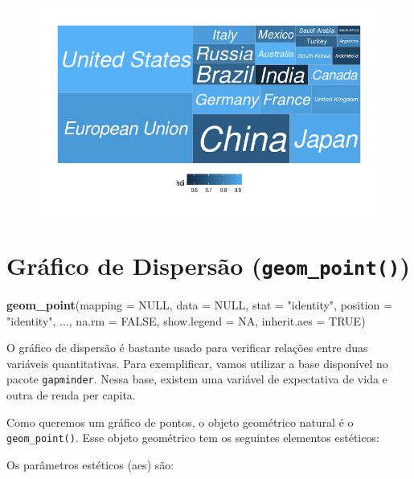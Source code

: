 \documentclass[]{book}
\newenvironment{Shaded}{\begin{snugshade}}{\end{snugshade}}
\newcommand{\KeywordTok}[1]{\textcolor[rgb]{0.13,0.29,0.53}{\textbf{#1}}}
\newcommand{\DataTypeTok}[1]{\textcolor[rgb]{0.13,0.29,0.53}{#1}}
\newcommand{\StringTok}[1]{\textcolor[rgb]{0.31,0.60,0.02}{#1}}
\newcommand{\OtherTok}[1]{\textcolor[rgb]{0.56,0.35,0.01}{#1}}
\newcommand{\NormalTok}[1]{#1}
\begin{document}
\begin{figure}
\centering
\includegraphics{images/treemapify.png}
\caption{}
\end{figure}

\section{\texorpdfstring{Gráfico de Dispersão
(\texttt{geom\_point()})}{Gráfico de Dispersão (geom\_point())}}\label{grafico-de-dispersao-geom_point}

\begin{Shaded}
\begin{Highlighting}[]
\KeywordTok{geom_point}\NormalTok{(}\DataTypeTok{mapping =} \OtherTok{NULL}\NormalTok{, }\DataTypeTok{data =} \OtherTok{NULL}\NormalTok{, }\DataTypeTok{stat =} \StringTok{"identity"}\NormalTok{, }\DataTypeTok{position =} \StringTok{"identity"}\NormalTok{,}
\NormalTok{           ..., }\DataTypeTok{na.rm =} \OtherTok{FALSE}\NormalTok{, }\DataTypeTok{show.legend =} \OtherTok{NA}\NormalTok{, }\DataTypeTok{inherit.aes =} \OtherTok{TRUE}\NormalTok{)}
\end{Highlighting}
\end{Shaded}

O gráfico de dispersão é bastante usado para verificar relações entre
duas variáveis quantitativas. Para exemplificar, vamos utilizar a base
disponível no pacote \texttt{gapminder}. Nessa base, existem uma
variável de expectativa de vida e outra de renda per capita.

Como queremos um gráfico de pontos, o objeto geométrico natural é o
\texttt{geom\_point()}. Esse objeto geométrico tem os seguintes
elementos estéticos:

Os parâmetros estéticos (aes) são:
\end{document}
